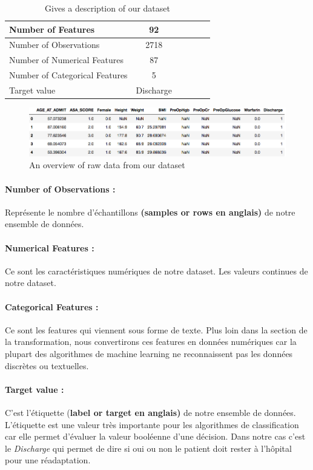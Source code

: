 \documentclass[12pt, french]{report}
\begin{document}
\begin{table}[h]
\centering
\begin{tabular}{|l|c|c|c|c|c|}
\hline
Number of Features & 92 \\
\hline
Number of Observations & 2718\\
\hline
Number of Numerical Features & 87\\
\hline
Number of Categorical Features & 5\\
\hline
Target value & Discharge\\
\hline

\end{tabular}
\caption{Gives a description of our dataset}
\label{tab:dataset}
\end{table}

\begin{figure}[h]
\includegraphics[width=18cm]{images/examplesfeatures.png}
\caption{An overview of raw data from our dataset}
\label{fig:samplesdataset}
\end{figure}


\paragraph*{Number of Observations :} Représente le nombre d'échantillons \textbf{(samples or rows en anglais)} de notre ensemble de données. 

\paragraph*{ Numerical Features :} Ce sont les caractéristiques numériques de notre dataset. Les valeurs continues de notre dataset.

\paragraph*{ Categorical Features :} Ce sont les features qui viennent sous forme de texte. Plus loin dans la section de la transformation, nous convertirons ces features en données numériques car la plupart des algorithmes de machine learning ne reconnaissent pas les données discrètes ou textuelles.

\paragraph*{ Target value :} C'est l'étiquette (\textbf{label or target en anglais)} de notre ensemble de données. L'étiquette est une valeur très importante pour les algorithmes de classification car elle permet d'évaluer la valeur booléenne d'une décision. Dans notre cas c'est le \textit{Discharge} qui permet de dire si oui ou non le patient doit rester à l'hôpital pour une réadaptation. \\
\end{document}
